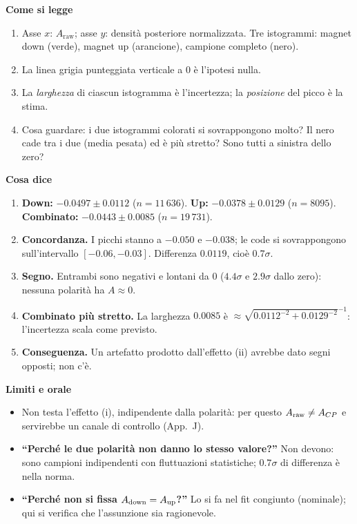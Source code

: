 \documentclass[10.5pt,a4paper]{article}
\newcommand{\Araw}{A_{\mathrm{raw}}}
\newcommand{\sez}[1]{\par\Needspace{6\baselineskip}\medskip\noindent\textbf{\large #1}\par\nopagebreak\smallskip}
\begin{document}
\sez{Come si legge}
\begin{enumerate}
\item Asse $x$: $\Araw$; asse $y$: densità posteriore normalizzata. Tre istogrammi: magnet down (verde), magnet up (arancione), campione completo (nero).
\item La linea grigia punteggiata verticale a $0$ è l'ipotesi nulla.
\item La \emph{larghezza} di ciascun istogramma è l'incertezza; la \emph{posizione} del picco è la stima.
\item Cosa guardare: i due istogrammi colorati si sovrappongono molto? Il nero cade tra i due (media pesata) ed è più stretto? Sono tutti a sinistra dello zero?
\end{enumerate}

\sez{Cosa dice}
\begin{enumerate}
\item \textbf{Down:} $-0.0497\pm0.0112$ ($n=11\,636$). \textbf{Up:} $-0.0378\pm0.0129$ ($n=8095$). \textbf{Combinato:} $-0.0443\pm0.0085$ ($n=19\,731$).
\item \textbf{Concordanza.} I picchi stanno a $-0.050$ e $-0.038$; le code si sovrappongono sull'intervallo $[-0.06,-0.03]$. Differenza $0.0119$, cioè $0.7\sigma$.
\item \textbf{Segno.} Entrambi sono negativi e lontani da $0$ ($4.4\sigma$ e $2.9\sigma$ dallo zero): nessuna polarità ha $A\approx0$.
\item \textbf{Combinato più stretto.} La larghezza $0.0085$ è $\approx\sqrt{0.0112^{-2}+0.0129^{-2}}^{-1}$: l'incertezza scala come previsto.
\item \textbf{Conseguenza.} Un artefatto prodotto dall'effetto (ii) avrebbe dato segni opposti; non c'è.
\end{enumerate}

\sez{Limiti e orale}
\begin{itemize}
\item Non testa l'effetto (i), indipendente dalla polarità: per questo $A_{\rm raw}\neq A_{CP}$ e servirebbe un canale di controllo (App.~J).
\item \textbf{``Perché le due polarità non danno lo stesso valore?''} Non devono: sono campioni indipendenti con fluttuazioni statistiche; $0.7\sigma$ di differenza è nella norma.
\item \textbf{``Perché non si fissa $A_{\rm down}=A_{\rm up}$?''} Lo si fa nel fit congiunto (nominale); qui si verifica che l'assunzione sia ragionevole.
\end{itemize}
\end{document}
